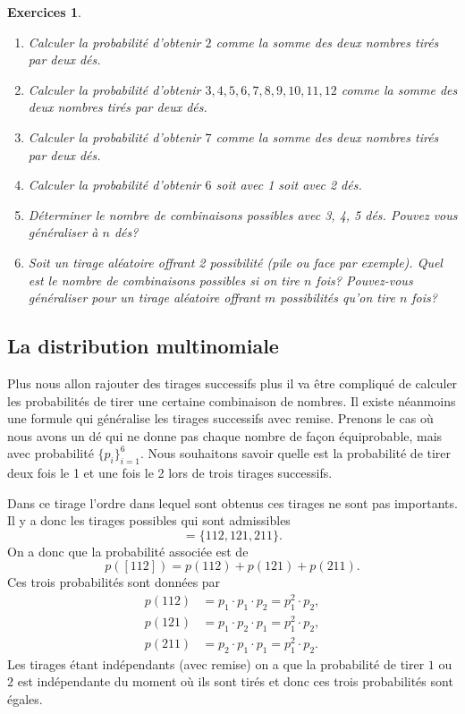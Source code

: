 \documentclass[a4paper,12pt]{book}
\newtheorem*{exercices}{Exercices}
\begin{document}
\begin{exercices}
\hfill\break
 \begin{enumerate}
  \item Calculer la probabilité d'obtenir $2$ comme la somme des deux nombres tirés par deux dés.
  \item Calculer la probabilité d'obtenir $3,4,5,6,7,8,9,10,11,12$ comme la somme des deux nombres tirés par deux dés.
  \item Calculer la probabilité d'obtenir $7$ comme la somme des deux nombres tirés par deux dés.
  \item Calculer la probabilité d'obtenir $6$ soit avec 1 soit avec 2 dés.
  \item Déterminer le nombre de combinaisons possibles avec 3, 4, 5 dés. Pouvez vous généraliser à $n$ dés?
  \item Soit un tirage aléatoire offrant 2 possibilité (pile ou face par exemple). Quel est le nombre de combinaisons possibles 
  si on tire $n$ fois? Pouvez-vous généraliser pour un tirage aléatoire offrant $m$ possibilités qu'on tire $n$ fois?
 \end{enumerate}

\end{exercices}

\subsection{La distribution multinomiale}

Plus nous allon rajouter des tirages successifs plus il va être compliqué de calculer les probabilités 
de tirer une certaine combinaison de nombres. Il existe néanmoins une formule qui généralise les tirages successifs avec
remise. Prenons le cas où nous avons un dé qui ne donne pas chaque nombre de façon équiprobable, mais avec probabilité $\{p_i\}_{i=1}^6$.
Nous souhaitons savoir quelle est la probabilité de tirer deux fois le 1 et une fois le 2 lors de trois tirages successifs. 

Dans ce tirage l'ordre dans lequel sont obtenus ces tirages ne sont pas importants. Il y a donc les tirages possibles qui sont
admissibles
\begin{equation}
 [112]=\{112, 121, 211\}.
\end{equation}
On a donc que la probabilité associée est de
\begin{equation}
 p([112])=p(112)+p(121)+p(211).
\end{equation}
Ces trois probabilités sont données par
\begin{align}
 p(112)&=p_1\cdot p_1\cdot p_2=p_1^2\cdot p_2,\\
 p(121)&=p_1\cdot p_2\cdot p_1=p_1^2\cdot p_2,\\
 p(211)&=p_2\cdot p_1\cdot p_1=p_1^2\cdot p_2.
\end{align}
Les tirages étant indépendants (avec remise) on a que la probabilité de tirer $1$ ou $2$ est indépendante 
du moment où ils sont tirés et donc ces trois probabilités sont égales.
\end{document}
